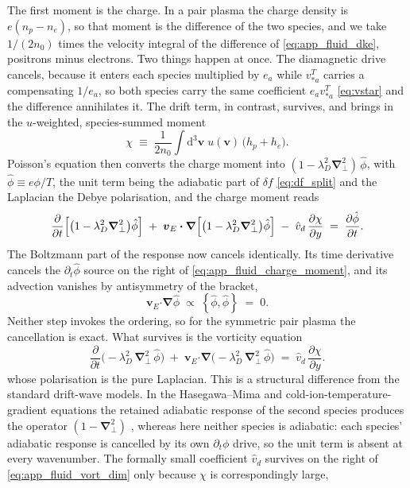 \documentclass{jpp}
\newcommand{\rmd}{\text{d}}
\newcommand{\bv}{\mathbf{v}}
\renewcommand{\vec}[1]{\boldsymbol{#1}}
\newcommand{\vec}[1]{\boldsymbol{#1}}
\providecommand{\bcdot}{\vec{\cdot}}
\newcommand{\grad}{{\vec{\nabla}}}
\newcommand{\pbra}[2]{\left\lbrace #1, #2 \right\rbrace}
\newcommand{\lambdaD}{\lambda_D}
\begin{document}
The first moment is the charge. In a pair plasma the charge density is $e(n_p - n_e)$, so that moment is the difference of the two species, and we take $1/(2n_0)$ times the velocity integral of the difference of \cref{eq:app_fluid_dke}, positrons minus electrons. Two things happen at once. The diamagnetic drive cancels, because it enters each species multiplied by $e_a$ while $v_{*a}^T$ carries a compensating $1/e_a$, so both species carry the same coefficient $e_a v_{*a}^T$ \cref{eq:vstar} and the difference annihilates it. The drift term, in contrast, survives, and brings in the $u$-weighted, species-summed moment
\begin{equation}\label{eq:app_fluid_chi_def}
\chi \;\equiv\; \frac{1}{2 n_0} \int \rmd^3\bv\; u(\bv)\,\bigl(h_p + h_e\bigr).
\end{equation}
Poisson's equation then converts the charge moment into $(1 - \lambdaD^2\grad_\perp^2)\,\hat\phi$, with $\hat\phi \equiv e\phi/T$, the unit term being the adiabatic part of $\delta f$ \cref{eq:df_split} and the Laplacian the Debye polarisation, and the charge moment reads
\begin{equation}\label{eq:app_fluid_charge_moment}
\frac{\partial}{\partial t}\Bigl[\bigl(1 - \lambdaD^2\grad_\perp^2\bigr)\hat\phi\Bigr]
\;+\; \vec{v}_E\bcdot\grad\Bigl[\bigl(1 - \lambdaD^2\grad_\perp^2\bigr)\hat\phi\Bigr]
\;-\; \hat{v}_d\,\frac{\partial \chi}{\partial y}
\;=\; \frac{\partial \hat\phi}{\partial t}.
\end{equation}
The Boltzmann part of the response now cancels identically. Its time derivative cancels the $\partial_t\hat\phi$ source on the right of \cref{eq:app_fluid_charge_moment}, and its advection vanishes by antisymmetry of the bracket,
\begin{equation}\label{eq:app_fluid_antisym}
\vec{v}_E\bcdot\grad\hat\phi \;\propto\; \pbra{\hat\phi}{\hat\phi} \;=\; 0 .
\end{equation}
Neither step invokes the ordering, so for the symmetric pair plasma the cancellation is exact. What survives is the vorticity equation
\begin{equation}\label{eq:app_fluid_vort_dim}
\frac{\partial}{\partial t}\bigl(-\lambdaD^2\,\grad_\perp^2\,\hat\phi\bigr) \;+\; \vec{v}_E\bcdot\grad\bigl(-\lambdaD^2\,\grad_\perp^2\,\hat\phi\bigr) \;=\; \hat{v}_d\,\frac{\partial \chi}{\partial y}.
\end{equation}
whose polarisation is the pure Laplacian. This is a structural difference from the standard drift-wave models. In the Hasegawa--Mima and cold-ion-temperature-gradient equations the retained adiabatic response of the second species produces the operator $(1 - \grad_\perp^2)$ \citep{HasegawaMima1978}, whereas here neither species is adiabatic: each species' adiabatic response is cancelled by its own $\partial_t\phi$ drive, so the unit term is absent at every wavenumber. The formally small coefficient $\hat{v}_d$ survives on the right of \cref{eq:app_fluid_vort_dim} only because $\chi$ is correspondingly large,
\end{document}

